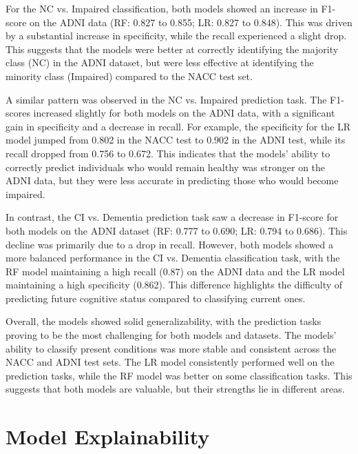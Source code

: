 For the NC vs. Impaired classification, both models showed an increase in F1-score on the ADNI data (RF: 0.827 to 0.855; LR: 0.827 to 0.848). This was driven by a substantial increase in specificity, while the recall experienced a slight drop. This suggests that the models were better at correctly identifying the majority class (NC) in the ADNI dataset, but were less effective at identifying the minority class (Impaired) compared to the NACC test set.

A similar pattern was observed in the NC vs. Impaired prediction task. The F1-scores increased slightly for both models on the ADNI data, with a significant gain in specificity and a decrease in recall. For example, the specificity for the LR model jumped from 0.802 in the NACC test to 0.902 in the ADNI test, while its recall dropped from 0.756 to 0.672. This indicates that the models' ability to correctly predict individuals who would remain healthy was stronger on the ADNI data, but they were less accurate in predicting those who would become impaired.

In contrast, the CI vs. Dementia prediction task saw a decrease in F1-score for both models on the ADNI dataset (RF: 0.777 to 0.690; LR: 0.794 to 0.686). This decline was primarily due to a drop in recall. However, both models showed a more balanced performance in the CI vs. Dementia classification task, with the RF model maintaining a high recall (0.87) on the ADNI data and the LR model maintaining a high specificity (0.862). This difference highlights the difficulty of predicting future cognitive status compared to classifying current ones.

Overall, the models showed solid generalizability, with the prediction tasks proving to be the most challenging for both models and datasets. The models' ability to classify present conditions was more stable and consistent across the NACC and ADNI test sets. The LR model consistently performed well on the prediction tasks, while the RF model was better on some classification tasks. This suggests that both models are valuable, but their strengths lie in different areas.


\section{Model Explainability}
